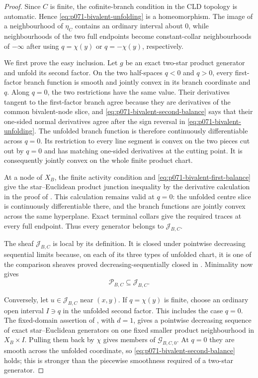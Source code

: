 \begin{proof}
Since $C$ is finite, the cofinite-branch condition in the CLD topology is
automatic.  Hence \eqref{eq:p071-bivalent-unfolding} is a homeomorphism.
The image of a neighbourhood of $\eta_C$ contains an ordinary interval
about $0$, while neighbourhoods of the two full endpoints become
constant-collar neighbourhoods of $-\infty$ after using $q=\chi(y)$ or
$q=-\chi(y)$, respectively.

We first prove the easy inclusion.  Let $g$ be an exact two-star product
generator and unfold its second factor.  On the two half-spaces $q<0$ and
$q>0$, every first-factor branch function is smooth and jointly convex in
its branch coordinate and $q$.  Along $q=0$, the two restrictions have the
same value.  Their derivatives tangent to the first-factor branch agree
because they are derivatives of the common bivalent-node slice, and
\eqref{eq:p071-bivalent-second-balance} says that their one-sided normal
derivatives agree after the sign reversal in
\eqref{eq:p071-bivalent-unfolding}.  The unfolded branch function is
therefore continuously differentiable across $q=0$.  Its restriction to
every line segment is convex on the two pieces cut out by $q=0$ and has
matching one-sided derivatives at the cutting point.  It is consequently
jointly convex on the whole finite product chart.

At a node of $X_B$, the finite activity condition and
\eqref{eq:p071-bivalent-first-balance} give the star--Euclidean product
junction inequality by the derivative calculation in the proof of
.  This calculation remains
valid at $q=0$: the unfolded centre slice is continuously differentiable
there, and the branch functions are jointly convex across the same
hyperplane.  Exact terminal collars give the required traces at every full
endpoint.  Thus every generator belongs to $\mathcal J_{B,C}$.

The sheaf $\mathcal J_{B,C}$ is local by its definition.  It is closed
under pointwise decreasing sequential limits because, on each of its three
types of unfolded chart, it is one of the comparison sheaves proved
decreasing-sequentially closed in
.  Minimality now
gives
\[
                         \mathcal P_{B,C}\subseteq\mathcal J_{B,C}.
\]

Conversely, let $u\in\mathcal J_{B,C}$ near $(x,y)$.  If
$q=\chi(y)$ is finite, choose an ordinary open interval $I\ni q$ in the
unfolded second factor.  This includes the case $q=0$.  The fixed-domain
assertion of
, with $d=1$, gives a
pointwise decreasing sequence of exact star--Euclidean generators on one
fixed smaller product neighbourhood in $X_B\times I$.  Pulling them back
by $\chi$ gives members of $\mathcal G_{B,C,0}$.  At $q=0$ they are smooth
across the unfolded coordinate, so
\eqref{eq:p071-bivalent-second-balance} holds; this is stronger than the
piecewise smoothness required of a two-star generator.


\end{proof}
